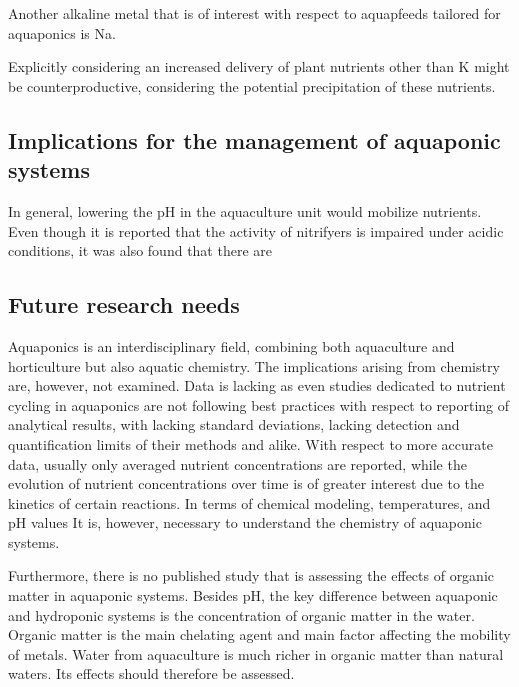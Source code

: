 \documentclass[
]{article}
\begin{document}
Another alkaline metal that is of interest with respect to aquapfeeds tailored for aquaponics is Na.

Explicitly considering an increased delivery of plant nutrients other than K might be counterproductive, considering the potential precipitation of these nutrients.

\hypertarget{implications-for-the-management-of-aquaponic-systems}{%
\subsection{Implications for the management of aquaponic systems}\label{implications-for-the-management-of-aquaponic-systems}}

In general, lowering the pH in the aquaculture unit would mobilize nutrients. Even though it is reported that the activity of nitrifyers is impaired under acidic conditions, it was also found that there are

\hypertarget{future-research-needs}{%
\subsection{Future research needs}\label{future-research-needs}}

Aquaponics is an interdisciplinary field, combining both aquaculture and horticulture but also aquatic chemistry. The implications arising from chemistry are, however, not examined. Data is lacking as even studies dedicated to nutrient cycling in aquaponics are not following best practices with respect to reporting of analytical results, with lacking standard deviations, lacking detection and quantification limits of their methods and alike.
With respect to more accurate data, usually only averaged nutrient concentrations are reported, while the evolution of nutrient concentrations over time is of greater interest due to the kinetics of certain reactions.
In terms of chemical modeling, temperatures, and pH values
It is, however, necessary to understand the chemistry of aquaponic systems.

Furthermore, there is no published study that is assessing the effects of organic matter in aquaponic systems. Besides pH, the key difference between aquaponic and hydroponic systems is the concentration of organic matter in the water. Organic matter is the main chelating agent and main factor affecting the mobility of metals. Water from aquaculture is much richer in organic matter than natural waters. Its effects should therefore be assessed.
\end{document}
